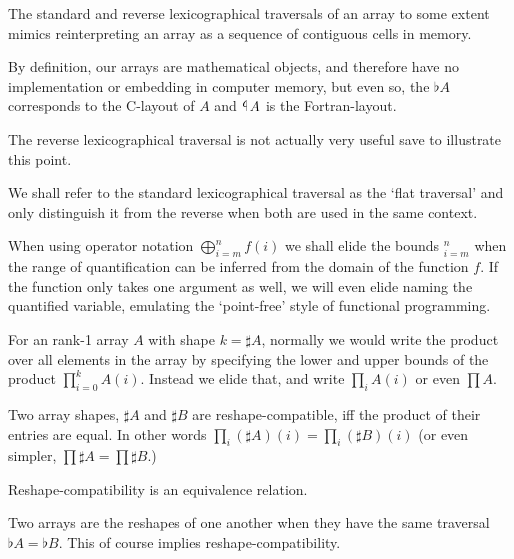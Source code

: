 \documentclass{DIKU-report-variant}
\newcommand\tlaf{\mathop{\rotatebox[origin=c]{180}{$\flat$}}}
\begin{document}
\begin{observation}
  \label{ob:c-fortran-order}
  The standard and reverse lexicographical traversals of an array to some extent
  mimics reinterpreting an array as a sequence of contiguous cells in memory.

  By definition, our arrays are mathematical objects, and therefore have no
  implementation or embedding in computer memory, but even so, the \(\flat A\)
  corresponds to the C-layout of \(A\) and \(\tlaf A\) is the Fortran-layout.

  The reverse lexicographical traversal is not actually very useful save to illustrate
  this point.
\end{observation}

\begin{remark}
  We shall refer to the standard lexicographical traversal as the `flat traversal'
  and only distinguish it from the reverse when both are used in the same
  context.
\end{remark}

\begin{remark}
  \label{rem:quant-elision}
  When using operator notation \(\bigoplus_{i=m}^n f(i)\)
  we shall elide the bounds \({}_{i=m}^n\) when the range of quantification can
  be inferred from the domain of the function \(f\). If the function only
  takes one argument as well, we will even elide naming the quantified variable,
  emulating the `point-free' style of functional programming.

  For an rank-1 array \(A\) with shape \(k = \sharp A\), normally we would
  write the product over all elements in the array by specifying the lower
  and upper bounds of the product \(\prod_{i=0}^{k} A(i)\). Instead we elide
  that, and write \(\prod_i A(i)\) or even \(\prod A\).
\end{remark}

\begin{definition}
  \label{def:reshape-comp} 
  Two array shapes, \(\sharp A\) and \(\sharp B\) are reshape-compatible, iff the product
  of their entries are equal. In other words
  \(\prod_{i} (\sharp A)(i) = \prod_{i} (\sharp B)(i)\) (or even simpler,
  \(\prod \sharp A = \prod \sharp B\).)

  Reshape-compatibility is an equivalence relation.
\end{definition}

\begin{definition}
  \label{def:reshape-equiv}
  Two arrays are the reshapes of one another when they have the same traversal
  \(\flat A = \flat B\). This of course implies reshape-compatibility.
\end{definition}
\end{document}
